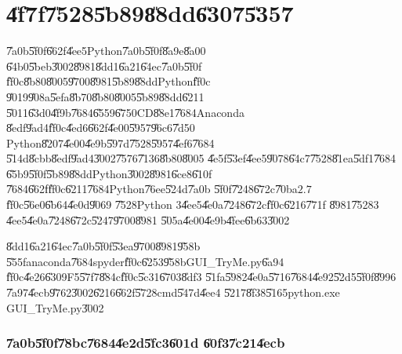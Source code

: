 \section{\U{4f7f}\U{7528}\U{5b89}\U{88dd}\U{6307}\U{5357}}

\U{7a0b}\U{5f0f}\U{662f}\U{4ee5}Python\U{7a0b}\U{5f0f}\U{8a9e}\U{8a00}%
\U{64b0}\U{5beb}\U{3002}\U{8981}\U{8dd1}\U{6a21}\U{64ec}\U{7a0b}\U{5f0f}%
\U{ff0c}\U{8b80}\U{8005}\U{9700}\U{8981}\U{5b89}\U{88dd}Python\U{ff0c}%
\U{9019}\U{908a}\U{5efa}\U{8b70}\U{8b80}\U{8005}\U{5b89}\U{88dd}\U{6211}%
\U{5011}\U{63d0}\U{4f9b}\U{7684}\U{6559}\U{6750}CD\U{88e1}\U{7684}Anaconda%
\U{8edf}\U{9ad4}\U{ff0c}\U{4ed6}\U{662f}\U{4e00}\U{5957}\U{96c6}\U{7d50}%
Python\U{8207}\U{4e00}\U{4e9b}\U{597d}\U{7528}\U{5957}\U{4ef6}\U{7684}%
\U{514d}\U{8cbb}\U{8edf}\U{9ad4}\U{3002}\U{7576}\U{7136}\U{8b80}\U{8005}%
\U{4e5f}\U{53ef}\U{4ee5}\U{9078}\U{64c7}\U{7528}\U{81ea}\U{5df1}\U{7684}%
\U{65b9}\U{5f0f}\U{5b89}\U{88dd}Python\U{3002}\U{8981}\U{6ce8}\U{610f}%
\U{7684}\U{662f}\U{ff0c}\U{6211}\U{7684}Python\U{76ee}\U{524d}\U{7a0b}%
\U{5f0f}\U{7248}\U{672c}\U{70ba}$2.7$\U{ff0c}\U{56e0}\U{6b64}\U{4e0d}\U{9069}%
\U{7528}Python $3$\U{4ee5}\U{4e0a}\U{7248}\U{672c}\U{ff0c}\U{6216}\U{771f}%
\U{8981}\U{7528}$3$\U{4ee5}\U{4e0a}\U{7248}\U{672c}\U{5247}\U{9700}\U{8981}%
\U{505a}\U{4e00}\U{4e9b}\U{4fee}\U{6b63}\U{3002}

\U{8dd1}\U{6a21}\U{64ec}\U{7a0b}\U{5f0f}\U{53ea}\U{9700}\U{8981}\U{958b}%
\U{555f}anaconda\U{7684}spyder\U{ff0c}\U{6253}\U{958b}GUI\_TryMe.py\U{6a94}%
\U{ff0c}\U{4e26}\U{6309}F5\U{57f7}\U{884c}\U{ff0c}\U{5c31}\U{6703}\U{8df3}%
\U{51fa}\U{5982}\U{4e0a}\U{5716}\U{7684}\U{4e92}\U{52d5}\U{5f0f}\U{8996}%
\U{7a97}\U{4ecb}\U{9762}\U{3002}\U{6216}\U{662f}\U{5728}cmd\U{547d}\U{4ee4}%
\U{5217}\U{8f38}\U{5165}python.exe GUI\_TryMe.py\U{3002}

\subsubsection{\U{7a0b}\U{5f0f}\U{78bc}\U{7684}\U{4e2d}\U{5fc3}\U{601d}%
\U{60f3}\U{7c21}\U{4ecb}}

